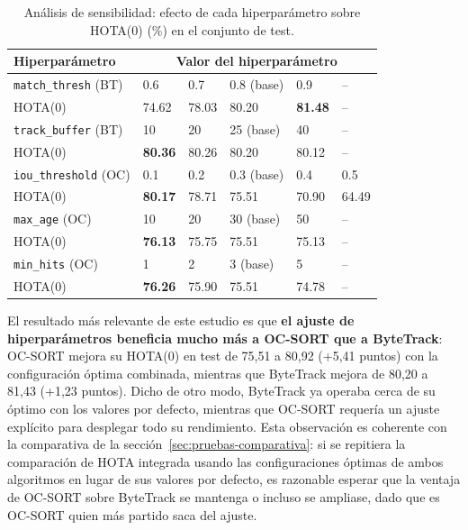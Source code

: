 \begin{table}[htp]
\centering
\caption{Análisis de sensibilidad: efecto de cada hiperparámetro sobre HOTA(0) (\%) en el conjunto de test.}
\label{tab:pruebas-hiperparametros-sensibilidad}
\renewcommand{\arraystretch}{1.2}
\small
\begin{tabular}{|p{3.1cm}|p{1.5cm}|p{1.5cm}|p{1.5cm}|p{1.5cm}|p{1.5cm}|}
\hline
\rowcolor{gray!25}
\textbf{Hiperparámetro} & \multicolumn{5}{c|}{\textbf{Valor del hiperparámetro}} \\
\hline
\texttt{match\_thresh} (BT) & 0.6 & 0.7 & 0.8 (base) & 0.9 & -- \\
\hline
HOTA(0) & 74.62 & 78.03 & 80.20 & \textbf{81.48} & -- \\
\hline
\texttt{track\_buffer} (BT) & 10 & 20 & 25 (base) & 40 & -- \\
\hline
HOTA(0) & \textbf{80.36} & 80.26 & 80.20 & 80.12 & -- \\
\hline
\texttt{iou\_threshold} (OC) & 0.1 & 0.2 & 0.3 (base) & 0.4 & 0.5 \\
\hline
HOTA(0) & \textbf{80.17} & 78.71 & 75.51 & 70.90 & 64.49 \\
\hline
\texttt{max\_age} (OC) & 10 & 20 & 30 (base) & 50 & -- \\
\hline
HOTA(0) & \textbf{76.13} & 75.75 & 75.51 & 75.13 & -- \\
\hline
\texttt{min\_hits} (OC) & 1 & 2 & 3 (base) & 5 & -- \\
\hline
HOTA(0) & \textbf{76.26} & 75.90 & 75.51 & 74.78 & -- \\
\hline
\end{tabular}
\end{table}

\FloatBarrier

El resultado más relevante de este estudio es que \textbf{el ajuste
de hiperparámetros beneficia mucho más a OC-SORT que a ByteTrack}: OC-SORT
mejora su HOTA(0) en test de 75,51 a 80,92 (+5,41 puntos) con la
configuración óptima combinada, mientras que ByteTrack mejora de 80,20 a
81,43 (+1,23 puntos). Dicho de otro modo, ByteTrack ya operaba cerca de su
óptimo con los valores por defecto, mientras que OC-SORT
requería un ajuste explícito para desplegar todo su rendimiento. Esta
observación es coherente con la comparativa de la
sección~\ref{sec:pruebas-comparativa}: si se repitiera la comparación de
HOTA integrada usando las configuraciones óptimas de ambos algoritmos en
lugar de sus valores por defecto, es razonable esperar que la ventaja de
OC-SORT sobre ByteTrack se mantenga o incluso se ampliase, dado que es
OC-SORT quien más partido saca del ajuste.

